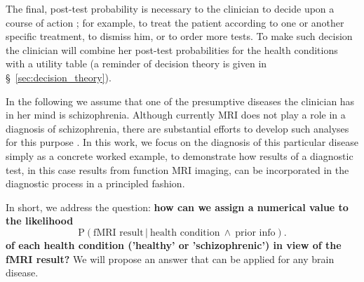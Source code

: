\documentclass[%
]{frontiersSCNS-nologo} %
\newcommand*{\chap}{ch.} %
\newcommand*{\sect}{\S} %
\newcommand*{\p}{\mathrm{P}}%
\renewcommand*{\|}{\mathpunct{|}}%
\newcommand*{\Land}{\mathbin{\ \land\ }}
\newcommand*{\Cond}{\mathpunct{\,|\ }}%
\begin{document}
The final, post-test probability is necessary to the clinician to decide
upon a course of action \citetext{\citealp[\chap~6]{soxetal1988_r2013};
  \citealp{goodman1999}; \citealp[\sect~5.7]{murphy2012}}; for example, to
treat the patient according to one or another specific treatment, to
dismiss him, or to order more tests. To make such decision the clinician
will combine her post-test probabilities for the health conditions with a
utility table (a reminder of decision theory is given in
\sect~\ref{sec:decision_theory}).

In the following we assume that one of the presumptive diseases
the clinician has in her mind is schizophrenia. Although currently MRI does not play a role in a diagnosis of schizophrenia, there are substantial efforts to develop such analyses for this purpose \citep{silvaetal2014}. In this work, we focus on the diagnosis of this particular disease simply as a concrete worked example, to demonstrate how results of a diagnostic test, in this case
results from function MRI imaging, can be incorporated in the diagnostic process in a principled fashion.

In short, we address the question: \textbf{how can we assign a
  numerical value to the likelihood}
\begin{equation}
    \p(\text{fMRI result} \Cond \text{health condition} \Land
    \text{prior info}).
\label{eq:test_prob_intro}
\end{equation}
\textbf{of each health condition ('healthy' or 'schizophrenic') in view of the fMRI result?} We will propose an answer that can be applied for any brain disease. 
\end{document}
